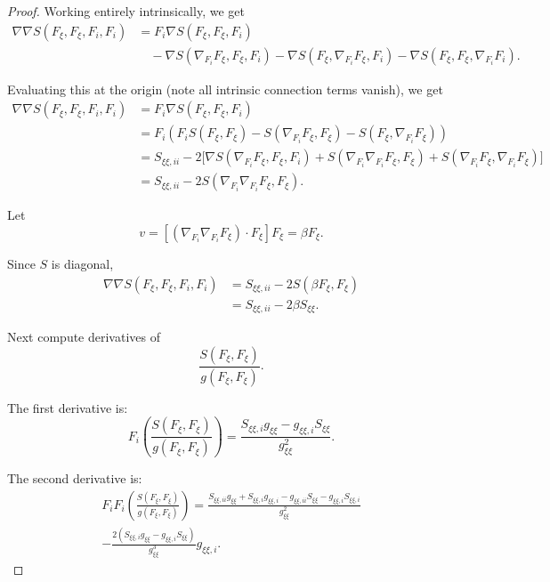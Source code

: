 \documentclass[12pt,letterpaper]{amsart}%
\numberwithin{mycounter}{section}
\theoremstyle{plain}
\numberwithin{equation}{section}
\theoremstyle{definition}
\newcommand{\maxidx}{\mathord{\xi}} %
\begin{document}
\begin{proof}
Working entirely intrinsically, we get 
\begin{align*}
\nabla\nabla S(F_{\maxidx},F_{\maxidx},F_{i},F_{i})
&= F_{i}\nabla S(F_{\maxidx},F_{\maxidx},F_{i})\\
&\quad -\nabla S(\nabla_{F_{i}}F_{\maxidx},F_{\maxidx},F_{i})
       -\nabla S(F_{\maxidx},\nabla_{F_{i}}F_{\maxidx},F_{i})
       -\nabla S(F_{\maxidx},F_{\maxidx},\nabla_{F_{i}}F_{i}).
\end{align*}

Evaluating this at the origin (note all intrinsic connection terms vanish), we get
\begin{align*}
\nabla\nabla S(F_{\maxidx},F_{\maxidx},F_{i},F_{i})
&= F_{i}\nabla S(F_{\maxidx},F_{\maxidx},F_{i})\\
&= F_{i}\left(F_{i}S(F_{\maxidx},F_{\maxidx})
     - S(\nabla_{F_{i}}F_{\maxidx},F_{\maxidx})
     - S(F_{\maxidx},\nabla_{F_{i}}F_{\maxidx})\right) \\
&= S_{\maxidx\maxidx,ii}
  - 2\big[\nabla S(\nabla_{F_{i}}F_{\maxidx},F_{\maxidx},F_{i})
         + S(\nabla_{F_{i}}\nabla_{F_{i}}F_{\maxidx},F_{\maxidx})
         + S(\nabla_{F_{i}}F_{\maxidx},\nabla_{F_{i}}F_{\maxidx})\big]\\
&= S_{\maxidx\maxidx,ii}
  - 2S(\nabla_{F_{i}}\nabla_{F_{i}}F_{\maxidx},F_{\maxidx}).
\end{align*}

Let
\[
v = \left[(\nabla_{F_{i}}\nabla_{F_{i}}F_{\maxidx})\cdot F_{\maxidx}\right] F_{\maxidx}
    = \beta F_{\maxidx}.
\]

Since $S$ is diagonal,
\begin{align*}
\nabla\nabla S(F_{\maxidx},F_{\maxidx},F_{i},F_{i})
&= S_{\maxidx\maxidx,ii} - 2S(\beta F_{\maxidx},F_{\maxidx})\\
&= S_{\maxidx\maxidx,ii} - 2\beta S_{\maxidx\maxidx}.
\end{align*}

Next compute derivatives of
\[
\frac{S(F_{\maxidx},F_{\maxidx})}{g(F_{\maxidx},F_{\maxidx})}.
\]

The first derivative is:
\[
F_{i}\left( \frac{S(F_{\maxidx},F_{\maxidx})}{g(F_{\maxidx},F_{\maxidx})} \right)
= \frac{S_{\maxidx\maxidx,i}g_{\maxidx\maxidx}
      - g_{\maxidx\maxidx,i}S_{\maxidx\maxidx}}
       {g_{\maxidx\maxidx}^{2}}.
\]

The second derivative is:
\begin{align*}
F_{i}F_{i} \left( \frac{S(F_{\maxidx},F_{\maxidx})}{g(F_{\maxidx},F_{\maxidx})}\right)
= \frac{
 S_{\maxidx\maxidx,ii}g_{\maxidx\maxidx}
 + S_{\maxidx\maxidx,i}g_{\maxidx\maxidx,i}
 - g_{\maxidx\maxidx,ii}S_{\maxidx\maxidx}
 - g_{\maxidx\maxidx,i}S_{\maxidx\maxidx,i}}
 {g_{\maxidx\maxidx}^{2}}
\\
 - \frac{2(S_{\maxidx\maxidx,i}g_{\maxidx\maxidx}
   - g_{\maxidx\maxidx,i}S_{\maxidx\maxidx})}{g_{\maxidx\maxidx}^{3}}
   g_{\maxidx\maxidx,i}.
\end{align*}


\end{proof}
\end{document}
